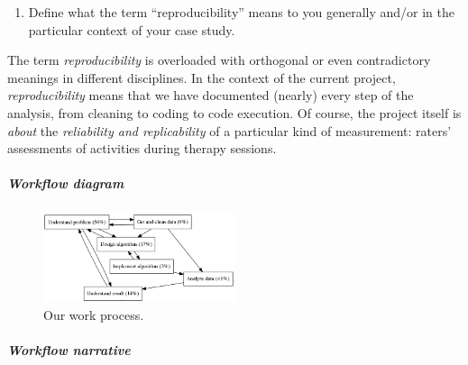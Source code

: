 \documentclass[]{article}
\begin{document}
\begin{enumerate}
\def\labelenumi{\arabic{enumi})}
\setcounter{enumi}{1}
\itemsep1pt\parskip0pt
\item
  Define what the term ``reproducibility'' means to you generally and/or
  in the particular context of your case study.
\end{enumerate}

The term \emph{reproducibility} is overloaded with orthogonal or even
contradictory meanings in different disciplines. In the context of the current
project, \emph{reproducibility} means that we have documented (nearly) every
step of the analysis, from cleaning to coding to code execution. Of course, the
project itself is \emph{about} the \emph{reliability and replicability} of a
particular kind of measurement: raters' assessments of activities during
therapy sessions.

\newpage

\subparagraph{Workflow diagram}\label{workflow-diagram}


\begin{figure}[h]
  \centering
    \includegraphics[width=0.5\textwidth]{work_process.png}
  \caption{Our work process.}
\end{figure}

\subparagraph{Workflow narrative}\label{workflow-narrative}
\end{document}
